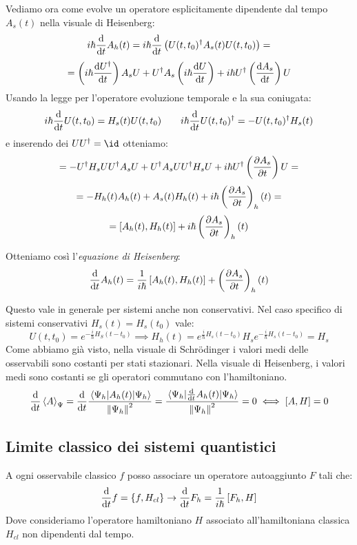 Vediamo ora come evolve un operatore esplicitamente dipendente dal tempo \(A_s(t)\) nella visuale di Heisenberg:
\[
    i\hbar \dv{t} A_h(t)= i\hbar \dv{t} \left(U(t,t_0)^\dagger A_s(t)U(t,t_0)\right) =
\]
\[
    = \left(i\hbar\dv{ U^\dagger }{t}\right) A_s U + U^\dagger A_s \left(i\hbar\dv{U}{t}\right) + i\hbar U^\dagger \left( \dv{A_s}{t} \right)U 
\]
Usando la legge per l'operatore evoluzione temporale e la sua coniugata:
\[
    i\hbar \dv{t} U(t,t_0)= H_s(t)U(t, t_0) \qquad i\hbar \dv{t} U (t, t_0)^\dagger = - U(t, t_0)^\dagger H_s(t)
\]
e inserendo dei \(UU^\dagger = \id\) otteniamo:
\[
    = - U ^\dagger H_s UU^\dagger A_s U +U^\dagger A_s U U^\dagger H_s U + i\hbar U^\dagger \left( \pdv{A_s}{t} \right)U =
\]
\[
    = - H_h(t) A_h(t)+ A_s(t)H_h  (t) + i\hbar \left( \pdv{A_s}{t} \right)_h(t)=
\]
\[
    =\left[ A_h(t), H_h(t) \right] + i\hbar \left( \pdv{A_s}{t} \right)_h(t)
\]

Otteniamo così l'\textit{equazione di Heisenberg}:
\begin{equation}
    \dv{t} A_h(t) = \frac{1}{i\hbar}\left[ A_h(t), H_h(t) \right]   + \left( \pdv{A_s}{t} \right)_h (t)
\end{equation}

Questo vale in generale per sistemi anche non conservativi. Nel caso specifico di sistemi conservativi \(H_s(t)= H_s(t_0)\) vale:
\begin{equation}
    U(t,t_0)= e^{-\frac{i}{\hbar } H_S (t-t_0)} \implies H_h(t)= e^{\frac{i}{\hbar }H_s(t-t_0)}H_s e^{-\frac{i}{\hbar} H_s(t-t_0)} = H_s
\end{equation}
Come abbiamo già visto, nella visuale di Schrödinger i valori medi delle osservabili sono costanti per stati stazionari.
Nella visuale di Heisenberg, i valori medi sono costanti se gli operatori commutano con l'hamiltoniano.
\begin{equation}
    \dv{t}\expval{A}_\Psi = \dv{t} \frac{\expval{A_h(t)}{\Psi_h}}{\norm{\Psi_h}^2}= \frac{\expval{\dv{t} A_h(t)}{\Psi_h}}{\norm{\Psi_h}^2} = 0 
        \iff \left[ A,H \right] =0
\end{equation}


\subsection{Limite classico dei sistemi quantistici}
A ogni osservabile classico \(f \) posso associare un operatore autoaggiunto \(F\) tali che:
\[
    \dv{t} f = \left\{ f, H_{cl} \right\} \to \dv{t} F_h = \frac{1}{i\hbar} \left[ F_h, H\right]   
\]
Dove consideriamo l'operatore hamiltoniano \(H\) associato all'hamiltoniana classica \(H_{cl}\) non dipendenti dal tempo.

